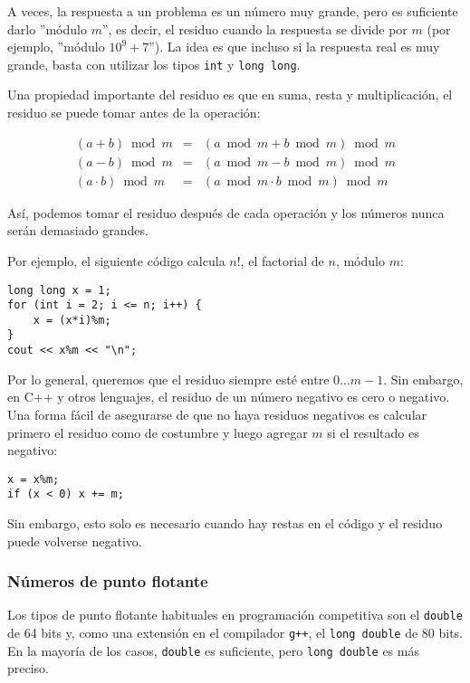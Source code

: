 A veces, la respuesta a un problema es un
número muy grande, pero es suficiente
darlo ''módulo $m$'', es decir,
el residuo cuando la respuesta se divide por $m$
(por ejemplo, ''módulo $10^9+7$'').
La idea es que incluso si la respuesta real
es muy grande,
basta con utilizar los tipos
\texttt{int} y \texttt{long long}.

Una propiedad importante del residuo es que
en suma, resta y multiplicación,
el residuo se puede tomar antes de la operación:

\[
\begin{array}{rcr}
(a+b) \bmod m & = & (a \bmod m + b \bmod m) \bmod m \\
(a-b) \bmod m & = & (a \bmod m - b \bmod m) \bmod m \\
(a \cdot b) \bmod m & = & (a \bmod m \cdot b \bmod m) \bmod m
\end{array}
\]

Así, podemos tomar el residuo después de cada operación
y los números nunca serán demasiado grandes.

Por ejemplo, el siguiente código calcula $n!$,
el factorial de $n$, módulo $m$:
\begin{lstlisting}
long long x = 1;
for (int i = 2; i <= n; i++) {
    x = (x*i)%m;
}
cout << x%m << "\n";
\end{lstlisting}

Por lo general, queremos que el residuo siempre
esté entre $0\ldots m-1$.
Sin embargo, en C++ y otros lenguajes,
el residuo de un número negativo
es cero o negativo.
Una forma fácil de asegurarse de que no haya
residuos negativos es calcular primero
el residuo como de costumbre y luego agregar $m$
si el resultado es negativo:
\begin{lstlisting}
x = x%m;
if (x < 0) x += m;
\end{lstlisting}
Sin embargo, esto solo es necesario cuando hay
restas en el código y el
residuo puede volverse negativo.

\subsubsection{Números de punto flotante}


Los tipos de punto flotante habituales en
programación competitiva son
el \texttt{double} de 64 bits
y, como una extensión en el compilador \texttt{g++},
el \texttt{long double} de 80 bits.
En la mayoría de los casos, \texttt{double} es suficiente,
pero \texttt{long double} es más preciso.

